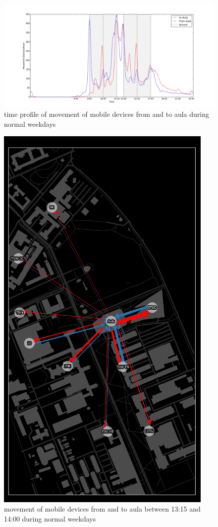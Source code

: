 \begin{figure}[H]
\centering
\includegraphics[scale=0.2]{building_fromTo_aulaGraph.png}
\captionsetup{justification=centering}
\caption{time profile of movement of mobile devices from and to aula during normal weekdays}
\label{figure:ES-buildingFromToAulaGraph}
\end{figure}

\begin{figure}[H]
\centering
\includegraphics[scale=0.1]{ES-map_1315to1400.png}
\captionsetup{justification=centering}
\caption{movement of mobile devices from and to aula between 13:15 and 14:00 during normal weekdays}
\label{figure:ES-1315to1400}
\end{figure}


